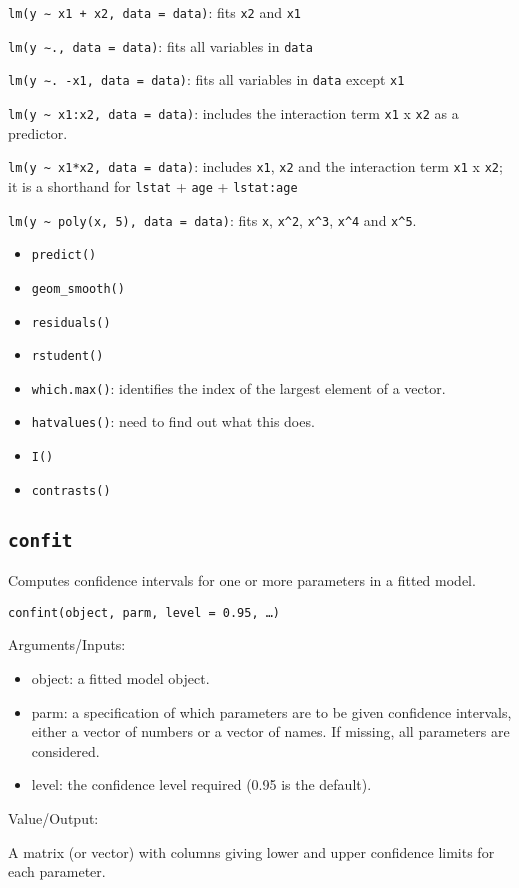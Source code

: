 \documentclass[]{article}
\begin{document}
\texttt{lm(y\ ∼\ x1\ +\ x2,\ data\ =\ data)}: fits \texttt{x2} and
\texttt{x1}

\texttt{lm(y\ ∼.,\ data\ =\ data)}: fits all variables in \texttt{data}

\texttt{lm(y\ ∼.\ -x1,\ data\ =\ data)}: fits all variables in
\texttt{data} except \texttt{x1}

\texttt{lm(y\ \textasciitilde{}\ x1:x2,\ data\ =\ data)}: includes the
interaction term \texttt{x1} x \texttt{x2} as a predictor.

\texttt{lm(y\ \textasciitilde{}\ x1*x2,\ data\ =\ data)}: includes
\texttt{x1}, \texttt{x2} and the interaction term \texttt{x1} x
\texttt{x2}; it is a shorthand for \texttt{lstat} + \texttt{age} +
\texttt{lstat:age}

\texttt{lm(y\ \textasciitilde{}\ poly(x,\ 5),\ data\ =\ data)}: fits
\texttt{x}, \texttt{x\^{}2}, \texttt{x\^{}3}, \texttt{x\^{}4} and
\texttt{x\^{}5}.

\begin{itemize}
\item
  \texttt{predict()}
\item
  \texttt{geom\_smooth()}
\item
  \texttt{residuals()}
\item
  \texttt{rstudent()}
\item
  \texttt{which.max()}: identifies the index of the largest element of a
  vector.
\item
  \texttt{hatvalues()}: need to find out what this does.
\item
  \texttt{I()}
\item
  \texttt{contrasts()}
\end{itemize}

\hypertarget{confit}{%
\subsection{\texorpdfstring{\texttt{confit}}{confit}}\label{confit}}

Computes confidence intervals for one or more parameters in a fitted
model.

\texttt{confint(object,\ parm,\ level\ =\ 0.95,\ \ldots{})}

Arguments/Inputs:

\begin{itemize}
\item
  object: a fitted model object.
\item
  parm: a specification of which parameters are to be given confidence
  intervals, either a vector of numbers or a vector of names. If
  missing, all parameters are considered.
\item
  level: the confidence level required (0.95 is the default).
\end{itemize}

Value/Output:

A matrix (or vector) with columns giving lower and upper confidence
limits for each parameter.
\end{document}
